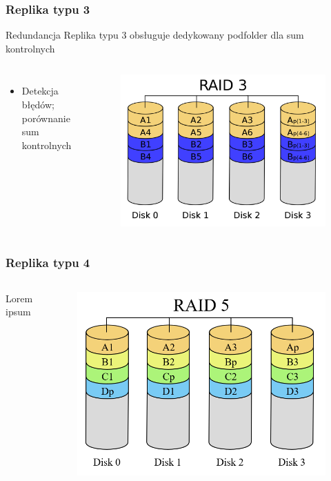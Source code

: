 \documentclass{beamer}
\begin{document}
\begin{frame}
	\frametitle{Replika typu 3}
		\begin{block}{Redundancja}
			Replika typu 3 obsługuje dedykowany podfolder dla sum kontrolnych
		\end{block}
	\begin{columns}
		\begin{itemize}
			\item Detekcja błędów; porównanie sum kontrolnych
		\end{itemize}
		\begin{figure}
			\includegraphics[scale=0.1]{raid-3.png}
		\end{figure}
	\end{columns}
\end{frame}

\begin{frame}
	\frametitle{Replika typu 4}
	\begin{columns}
		\column{0.4\textwidth}
		Lorem ipsum
		\column{0.6\textwidth}
		\begin{figure}
			\includegraphics[scale=0.2]{raid-5.png}
		\end{figure}
	\end{columns}
\end{frame}
		
\end{document}
